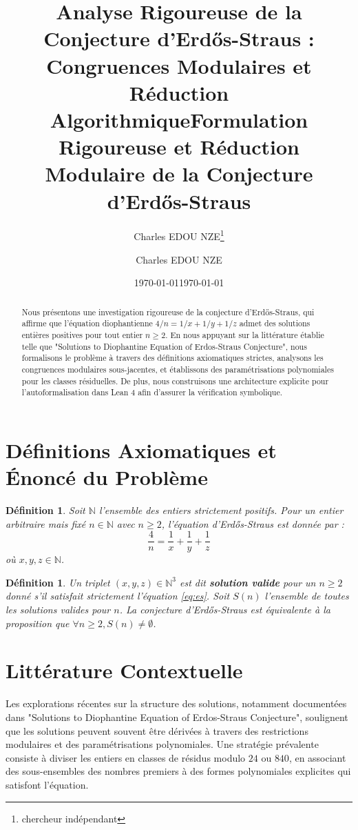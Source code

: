 \documentclass[12pt,a4paper]{article}
\title{Analyse Rigoureuse de la Conjecture d'Erd\H{o}s-Straus : Congruences Modulaires et R\'eduction Algorithmique}
\author{Charles EDOU NZE\thanks{chercheur ind\'ependant}}
\date{\today}
\title{Formulation Rigoureuse et R\'eduction Modulaire de la Conjecture d'Erd\H{o}s-Straus}
\author{Charles EDOU NZE}
\date{\today}
\newtheorem{definition}[theorem]{D\'efinition}
\begin{document}
\maketitle

\begin{abstract}
Nous pr\'esentons une investigation rigoureuse de la conjecture d'Erd\H{o}s-Straus, qui affirme que l'\'equation diophantienne $4/n = 1/x + 1/y + 1/z$ admet des solutions enti\`eres positives pour tout entier $n \ge 2$. En nous appuyant sur la litt\'erature \'etablie telle que "Solutions to Diophantine Equation of Erdos-Straus Conjecture", nous formalisons le probl\`eme \`a travers des d\'efinitions axiomatiques strictes, analysons les congruences modulaires sous-jacentes, et \'etablissons des param\'etrisations polynomiales pour les classes r\'esiduelles. De plus, nous construisons une architecture explicite pour l'autoformalisation dans Lean 4 afin d'assurer la v\'erification symbolique.
\end{abstract}

\section{D\'efinitions Axiomatiques et \'Enonc\'e du Probl\`eme}
\begin{definition}
Soit $\mathbb{N}$ l'ensemble des entiers strictement positifs. Pour un entier arbitraire mais fix\'e $n \in \mathbb{N}$ avec $n \ge 2$, l'\'equation d'Erd\H{o}s-Straus est donn\'ee par :
\begin{equation}
\frac{4}{n} = \frac{1}{x} + \frac{1}{y} + \frac{1}{z} \label{eq:es}
\end{equation}
o\`u $x, y, z \in \mathbb{N}$.
\end{definition}
\begin{definition}
Un triplet $(x, y, z) \in \mathbb{N}^3$ est dit \textbf{solution valide} pour un $n \ge 2$ donn\'e s'il satisfait strictement l'\'equation \eqref{eq:es}. Soit $S(n)$ l'ensemble de toutes les solutions valides pour $n$. La conjecture d'Erd\H{o}s-Straus est \'equivalente \`a la proposition que $\forall n \ge 2, S(n) \neq \emptyset$.
\end{definition}

\section{Litt\'erature Contextuelle}
Les explorations r\'ecentes sur la structure des solutions, notamment document\'ees dans "Solutions to Diophantine Equation of Erdos-Straus Conjecture", soulignent que les solutions peuvent souvent \^etre d\'eriv\'ees \`a travers des restrictions modulaires et des param\'etrisations polynomiales. Une strat\'egie pr\'evalente consiste \`a diviser les entiers en classes de r\'esidus modulo $24$ ou $840$, en associant des sous-ensembles des nombres premiers \`a des formes polynomiales explicites qui satisfont l'\'equation.
\end{document}
